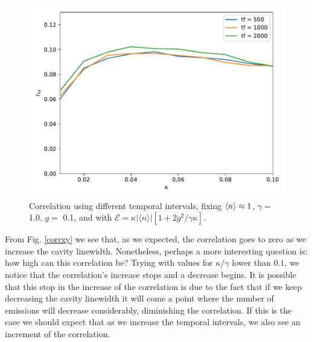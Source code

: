 \documentclass[conference]{IEEEtran}
\begin{document}
\begin{center}
\begin{figure}[h!]
\begin{center}
\includegraphics[scale = 0.45]{million2.pdf}
\caption{\small{Correlation using different temporal intervals, fixing $\expval{n} \approx 1$, $\gamma =$ 1.0, $g =$ 0.1, and with  $\mathcal{E} =  \kappa |\langle n \rangle|[1 + 2g^2/\gamma \kappa]$.}}  \label{errorzz}
\end{center}
\end{figure}
\end{center}
From Fig. \ref{corrxy} we see that, as we expected, the correlation goes to zero as we increase the cavity linewidth. Nonetheless, perhaps a more interesting question is: how high can this correlation be? Trying with values for $\kappa/\gamma$ lower than $0.1$, we notice that the correlation's increase stops and a decrease begins. It is possible that this stop in the increase of the correlation is due to the fact that if we keep decreasing the cavity linewidth it will come a point where the number of emissions will decrease considerably, diminishing the correlation. If this is the case we should expect that as we increase the temporal intervals, %
we also see an increment of the correlation.

\end{document}
